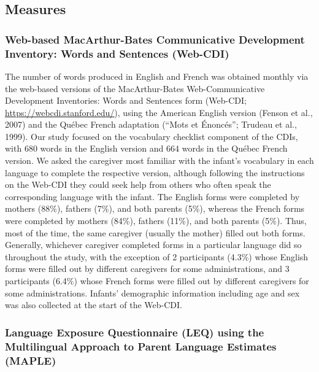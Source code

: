 \documentclass[
  english,
  ,man,floatsintext]{apa6}
\begin{document}
\hypertarget{measures}{%
\subsection{Measures}\label{measures}}

\hypertarget{web-based-macarthur-bates-communicative-development-inventory-words-and-sentences-web-cdi}{%
\subsubsection{Web-based MacArthur-Bates Communicative Development Inventory: Words and Sentences (Web-CDI)}\label{web-based-macarthur-bates-communicative-development-inventory-words-and-sentences-web-cdi}}

The number of words produced in English and French was obtained monthly via the web-based versions of the MacArthur-Bates Web-Communicative Development Inventories: Words and Sentences form (Web-CDI; \url{https://webcdi.stanford.edu/}), using the American English version (Fenson et al., 2007) and the Québec French adaptation (``Mots et Énoncés''; Trudeau et al., 1999). Our study focused on the vocabulary checklist component of the CDIs, with 680 words in the English version and 664 words in the Québec French version. We asked the caregiver most familiar with the infant's vocabulary in each language to complete the respective version, although following the instructions on the Web-CDI they could seek help from others who often speak the corresponding language with the infant. The English forms were completed by mothers (88\%), fathers (7\%), and both parents (5\%), whereas the French forms were completed by mothers (84\%), fathers (11\%), and both parents (5\%). Thus, most of the time, the same caregiver (usually the mother) filled out both forms. Generally, whichever caregiver completed forms in a particular language did so throughout the study, with the exception of 2 participants (4.3\%) whose English forms were filled out by different caregivers for some administrations, and 3 participants (6.4\%) whose French forms were filled out by different caregivers for some administrations. Infants' demographic information including age and sex was also collected at the start of the Web-CDI.

\hypertarget{language-exposure-questionnaire-leq-using-the-multilingual-approach-to-parent-language-estimates-maple}{%
\subsubsection{Language Exposure Questionnaire (LEQ) using the Multilingual Approach to Parent Language Estimates (MAPLE)}\label{language-exposure-questionnaire-leq-using-the-multilingual-approach-to-parent-language-estimates-maple}}
\end{document}
